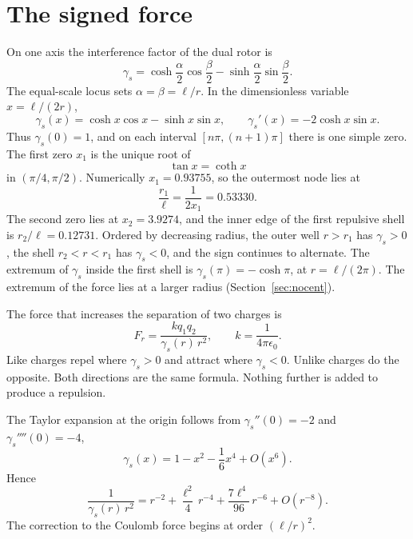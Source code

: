 \documentclass[a4paper]{article}
\begin{document}
\section{The signed force}
\label{sec:force}

On one axis the interference factor of the dual rotor is
\[
\gamma_s
  =\cosh\frac{\alpha}{2}\cos\frac{\beta}{2}
  -\sinh\frac{\alpha}{2}\sin\frac{\beta}{2}.
\]
The equal-scale locus sets \(\alpha=\beta=\ell/r\). In the dimensionless variable \(x=\ell/(2r)\),
\begin{equation}
\label{eq:gamma}
\gamma_s(x)=\cosh x\cos x-\sinh x\sin x,
\qquad
\gamma_s'(x)=-2\cosh x\sin x.
\end{equation}
Thus \(\gamma_s(0)=1\), and on each interval \([n\pi,(n+1)\pi]\) there is one simple zero. The first zero \(x_1\) is the unique root of
\begin{equation}
\label{eq:node}
\tan x=\coth x
\end{equation}
in \((\pi/4,\pi/2)\). Numerically \(x_1=0.93755\), so the outermost node lies at
\[
\frac{r_1}{\ell}=\frac{1}{2x_1}=0.53330.
\]
The second zero lies at \(x_2=3.9274\), and the inner edge of the first repulsive shell is \(r_2/\ell=0.12731\). Ordered by decreasing radius, the outer well \(r>r_1\) has \(\gamma_s>0\), the shell \(r_2<r<r_1\) has \(\gamma_s<0\), and the sign continues to alternate. The extremum of \(\gamma_s\) inside the first shell is \(\gamma_s(\pi)=-\cosh\pi\), at \(r=\ell/(2\pi)\). The extremum of the force lies at a larger radius (Section~\ref{sec:nocent}).

The force that increases the separation of two charges is
\begin{equation}
\label{eq:force}
F_r=\frac{k q_1 q_2}{\gamma_s(r)\,r^{2}},
\qquad
k=\frac{1}{4\pi\epsilon_0}.
\end{equation}
Like charges repel where \(\gamma_s>0\) and attract where \(\gamma_s<0\). Unlike charges do the opposite. Both directions are the same formula. Nothing further is added to produce a repulsion.

The Taylor expansion at the origin follows from \(\gamma_s''(0)=-2\) and \(\gamma_s''''(0)=-4\),
\begin{equation}
\label{eq:series}
\gamma_s(x)=1-x^{2}-\frac16 x^{4}+O(x^{6}).
\end{equation}
Hence
\[
\frac{1}{\gamma_s(r)\,r^{2}}
  =r^{-2}+\frac{\ell^{2}}{4}\,r^{-4}+\frac{7\ell^{4}}{96}\,r^{-6}+O(r^{-8}).
\]
The correction to the Coulomb force begins at order \((\ell/r)^{2}\).
\end{document}
